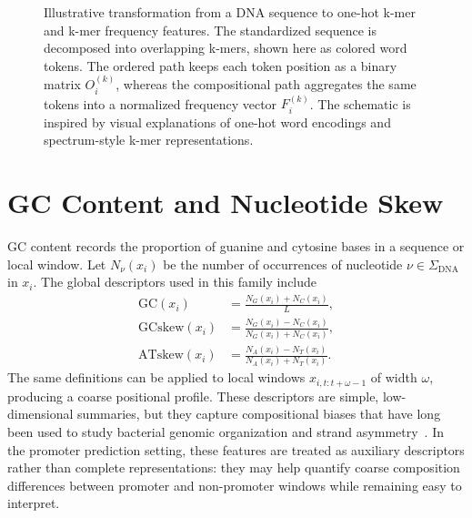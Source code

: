 \begin{figure}[H]
\caption{Illustrative transformation from a DNA sequence to one-hot k-mer and k-mer frequency features. The standardized sequence is decomposed into overlapping k-mers, shown here as colored word tokens. The ordered path keeps each token position as a binary matrix $O_i^{(k)}$, whereas the compositional path aggregates the same tokens into a normalized frequency vector $F_i^{(k)}$. The schematic is inspired by visual explanations of one-hot word encodings and spectrum-style k-mer representations.}
\label{fig:onehot-kmer-feature-diagram}
\end{figure}

\section{GC Content and Nucleotide Skew}\label{sec:features-gc-skew}

GC content records the proportion of guanine and cytosine bases in a sequence or local window. Let $N_\nu(x_i)$ be the number of occurrences of nucleotide $\nu\in\Sigma_{\mathrm{DNA}}$ in $x_i$. The global descriptors used in this family include
\begin{align}
\mathrm{GC}(x_i) &= \frac{N_G(x_i)+N_C(x_i)}{L}, \\
\mathrm{GCskew}(x_i) &= \frac{N_G(x_i)-N_C(x_i)}{N_G(x_i)+N_C(x_i)}, \\
\mathrm{ATskew}(x_i) &= \frac{N_A(x_i)-N_T(x_i)}{N_A(x_i)+N_T(x_i)}.
\end{align}
The same definitions can be applied to local windows $x_{i,t:t+\omega-1}$ of width $\omega$, producing a coarse positional profile. These descriptors are simple, low-dimensional summaries, but they capture compositional biases that have long been used to study bacterial genomic organization and strand asymmetry~\citep{lobry1996asymmetric}. In the promoter prediction setting, these features are treated as auxiliary descriptors rather than complete representations: they may help quantify coarse composition differences between promoter and non-promoter windows while remaining easy to interpret.

